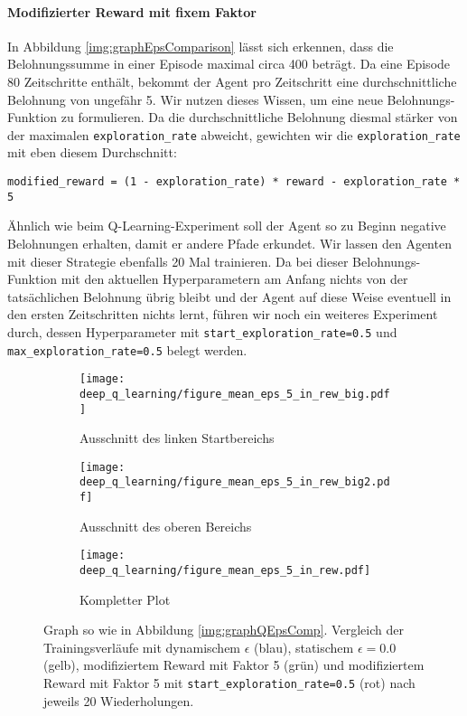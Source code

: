 \paragraph{Modifizierter Reward mit fixem Faktor}
In Abbildung \ref{img:graphEpsComparison} lässt sich erkennen, dass die Belohnungssumme in einer Episode maximal circa 400 beträgt. Da eine Episode 80 Zeitschritte enthält, bekommt der Agent pro Zeitschritt eine durchschnittliche Belohnung von ungefähr 5. Wir nutzen dieses Wissen, um eine neue Belohnungs-Funktion zu formulieren. Da die durchschnittliche Belohnung diesmal stärker von der maximalen \texttt{exploration_rate} abweicht, gewichten wir die \texttt{exploration_rate} mit eben diesem Durchschnitt:
\begin{verbatim}
modified_reward = (1 - exploration_rate) * reward - exploration_rate * 5
\end{verbatim}
Ähnlich wie beim Q-Learning-Experiment soll der Agent so zu Beginn negative Belohnungen erhalten, damit er andere Pfade erkundet. Wir lassen den Agenten mit dieser Strategie ebenfalls 20 Mal trainieren. Da bei dieser Belohnungs-Funktion mit den aktuellen Hyperparametern am Anfang nichts von der tatsächlichen Belohnung übrig bleibt und der Agent auf diese Weise eventuell in den ersten Zeitschritten nichts lernt, führen wir noch ein weiteres Experiment durch, dessen Hyperparameter mit \texttt{start_exploration_rate=0.5} und \texttt{max_exploration_rate=0.5} belegt werden.

\begin{figure}[h]
    \centering
    \begin{subfigure}[b]{0.49\textwidth}
        \texttt{[image: deep\_q\_learning/figure\_mean\_eps\_5\_in\_rew\_big.pdf]}
        \caption{Ausschnitt des linken Startbereichs}
        \label{img:graphEps5InRewBig}
    \end{subfigure}
    \begin{subfigure}[b]{0.49\textwidth}
        \texttt{[image: deep\_q\_learning/figure\_mean\_eps\_5\_in\_rew\_big2.pdf]}
        \caption{Ausschnitt des oberen Bereichs}
        \label{img:graphEps5InRewBig2}
    \end{subfigure}
    \begin{subfigure}[b]{0.7\textwidth}
        \texttt{[image: deep\_q\_learning/figure\_mean\_eps\_5\_in\_rew.pdf]}
        \caption{Kompletter Plot}
        \label{img:graphEps5InRew}
    \end{subfigure}
    \caption{Graph so wie in Abbildung \ref{img:graphQEpsComp}. Vergleich der Trainingsverläufe mit dynamischem $ \epsilon $ (blau), statischem $ \epsilon = 0.0 $ (gelb), modifiziertem Reward mit Faktor 5 (grün) und modifiziertem Reward mit Faktor 5 mit \texttt{start_exploration_rate=0.5} (rot) nach jeweils 20 Wiederholungen.}
    \label{img:graphEps5InRewBoth}
\end{figure} 

